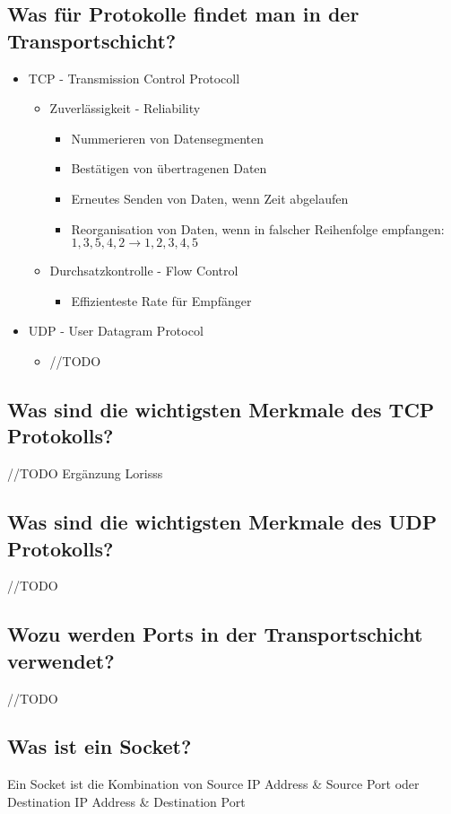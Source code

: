 \subsection*{Was für Protokolle findet man in der Transportschicht?}
\begin{itemize}
    \item TCP - Transmission Control Protocoll
    \begin{itemize}
        \item Zuverlässigkeit - Reliability
        \begin{itemize}
            \item Nummerieren von Datensegmenten
            \item Bestätigen von übertragenen Daten
            \item Erneutes Senden von Daten, wenn Zeit abgelaufen
            \item Reorganisation von Daten, wenn in falscher Reihenfolge empfangen: $1,3,5,4,2 \rightarrow 1,2,3,4,5$
        \end{itemize}
        \item Durchsatzkontrolle - Flow Control
        \begin{itemize}
            \item Effizienteste Rate für Empfänger
        \end{itemize}
    \end{itemize}
    \item UDP - User Datagram Protocol
    \begin{itemize}
        \item //TODO
    \end{itemize}
\end{itemize}
\subsection*{Was sind die wichtigsten Merkmale des TCP Protokolls?}
//TODO
Ergänzung Lorisss
\subsection*{Was sind die wichtigsten Merkmale des UDP Protokolls?}
//TODO
\subsection*{Wozu werden Ports in der Transportschicht verwendet?}
//TODO
\subsection*{Was ist ein Socket?}
Ein Socket ist die Kombination von Source IP Address \& Source Port oder Destination IP Address \& Destination Port
